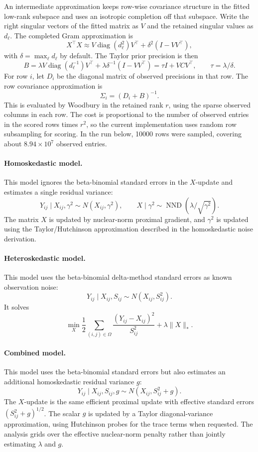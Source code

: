 \documentclass[11pt]{article}
\begin{document}
An intermediate approximation keeps row-wise covariance structure in the fitted
low-rank subspace and uses an isotropic completion off that subspace.  Write the
right singular vectors of the fitted matrix as \(V\) and the retained singular
values as \(d_\ell\).  The completed Gram approximation is
\[
X^\top X
\approx
V\operatorname{diag}(d_\ell^2)V^\top
+ \delta^2(I-VV^\top),
\]
with \(\delta=\max_\ell d_\ell\) by default.  The Taylor prior precision is then
\[
B
=
\lambda V\operatorname{diag}(d_\ell^{-1})V^\top
+ \lambda\delta^{-1}(I-VV^\top)
=
\tau I + VCV^\top,
\qquad
\tau=\lambda/\delta.
\]
For row \(i\), let \(D_i\) be the diagonal matrix of observed precisions in that
row.  The row covariance approximation is
\[
\Sigma_i = (D_i+B)^{-1}.
\]
This is evaluated by Woodbury in the retained rank \(r\), using the sparse
observed columns in each row.  The cost is proportional to the number of
observed entries in the scored rows times \(r^2\), so the current implementation
uses random row subsampling for scoring.  In the run below, 10000 rows were
sampled, covering about \(8.94\times 10^7\) observed entries.

\paragraph{Homoskedastic model.}
This model ignores the beta-binomial standard errors in the \(X\)-update and
estimates a single residual variance:
\[
Y_{ij}\mid X_{ij},\gamma^2 \sim N(X_{ij},\gamma^2),
\qquad
X\mid\gamma^2 \sim \operatorname{NND}(\lambda/\sqrt{\gamma^2}).
\]
The matrix \(X\) is updated by nuclear-norm proximal gradient, and
\(\gamma^2\) is updated using the Taylor/Hutchinson approximation described in
the homoskedastic noise derivation.

\paragraph{Heteroskedastic model.}
This model uses the beta-binomial delta-method standard errors as known
observation noise:
\[
Y_{ij}\mid X_{ij},S_{ij} \sim N(X_{ij},S_{ij}^2).
\]
It solves
\[
\min_X
\frac12\sum_{(i,j)\in\Omega}
\frac{(Y_{ij}-X_{ij})^2}{S_{ij}^2}
+\lambda\|X\|_*.
\]

\paragraph{Combined model.}
This model uses the beta-binomial standard errors but also estimates an
additional homoskedastic residual variance \(g\):
\[
Y_{ij}\mid X_{ij},S_{ij},g
\sim N(X_{ij},S_{ij}^2+g).
\]
The \(X\)-update is the same efficient proximal update with effective standard
errors \((S_{ij}^2+g)^{1/2}\).  The scalar \(g\) is updated by a Taylor
diagonal-variance approximation, using Hutchinson probes for the trace terms
when requested.  The analysis grids over the effective nuclear-norm penalty
rather than jointly estimating \(\lambda\) and \(g\).
\end{document}
